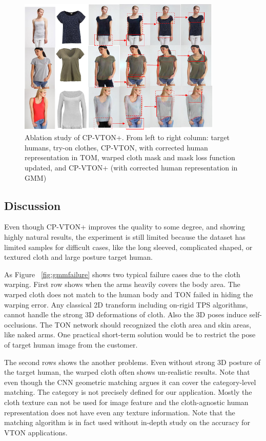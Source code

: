 \begin{figure}[t]
\centering
\includegraphics[height=6.5cm, scale=1]{figures/ablation.png} 
\caption{Ablation study of CP-VTON+. From left to right column: target humans, try-on clothes, CP-VTON, with corrected human representation in TOM, warped cloth mask and mask loss function updated, and CP-VTON+ (with corrected human representation in GMM)
}
\label{fig:ablation}
\end{figure}


\subsection{Discussion}

Even though CP-VTON+ improves the quality to some degree, and showing highly natural results, the experiment is still limited because the dataset has limited samples for difficult cases, like the long sleeved, complicated shaped, or textured cloth and large posture target human. 

As Figure ~\ref{fig:gmmfailure} shows two typical failure cases due to the cloth warping. First row shows when the arms heavily covers the body area. The warped cloth does not match to the human body and TON failed in hiding the warping error. 
Any classical 2D transform including on-rigid TPS algorithms, cannot handle the strong 3D deformations of cloth.  Also the 3D poses induce self-occlusions. The TON network should recognized the cloth area and skin areas, like naked arms. One practical short-term solution would be to restrict the pose of target human image from the customer. 

The second rows shows the another problems. Even without strong 3D posture of the target human, the warped cloth often shows un-realistic results. Note that even though the CNN geometric matching argues it can cover the category-level matching. The category is not precisely defined for our application. Mostly the cloth texture can not be used for image feature and the cloth-agnostic human representation does not have even any texture information. Note that the matching algorithm is in fact used without in-depth study on the accuracy for VTON applications. 

